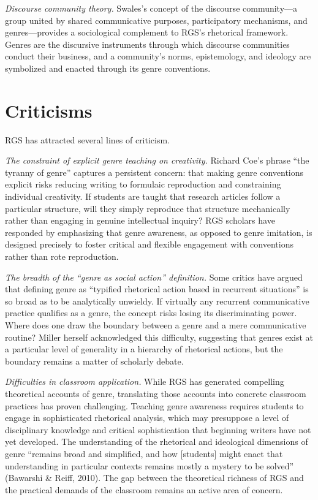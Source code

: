 \documentclass[12pt]{article}
\begin{document}
\textit{Discourse community theory.} Swales's concept of the discourse community---a group united by shared communicative purposes, participatory mechanisms, and genres---provides a sociological complement to RGS's rhetorical framework. Genres are the discursive instruments through which discourse communities conduct their business, and a community's norms, epistemology, and ideology are symbolized and enacted through its genre conventions.

\section{Criticisms}

RGS has attracted several lines of criticism.

\textit{The constraint of explicit genre teaching on creativity.} Richard Coe's phrase ``the tyranny of genre'' captures a persistent concern: that making genre conventions explicit risks reducing writing to formulaic reproduction and constraining individual creativity. If students are taught that research articles follow a particular structure, will they simply reproduce that structure mechanically rather than engaging in genuine intellectual inquiry? RGS scholars have responded by emphasizing that genre awareness, as opposed to genre imitation, is designed precisely to foster critical and flexible engagement with conventions rather than rote reproduction.

\textit{The breadth of the ``genre as social action'' definition.} Some critics have argued that defining genre as ``typified rhetorical action based in recurrent situations'' is so broad as to be analytically unwieldy. If virtually any recurrent communicative practice qualifies as a genre, the concept risks losing its discriminating power. Where does one draw the boundary between a genre and a mere communicative routine? Miller herself acknowledged this difficulty, suggesting that genres exist at a particular level of generality in a hierarchy of rhetorical actions, but the boundary remains a matter of scholarly debate.

\textit{Difficulties in classroom application.} While RGS has generated compelling theoretical accounts of genre, translating those accounts into concrete classroom practices has proven challenging. Teaching genre awareness requires students to engage in sophisticated rhetorical analysis, which may presuppose a level of disciplinary knowledge and critical sophistication that beginning writers have not yet developed. The understanding of the rhetorical and ideological dimensions of genre ``remains broad and simplified, and how [students] might enact that understanding in particular contexts remains mostly a mystery to be solved'' (Bawarshi \& Reiff, 2010). The gap between the theoretical richness of RGS and the practical demands of the classroom remains an active area of concern.
\end{document}
